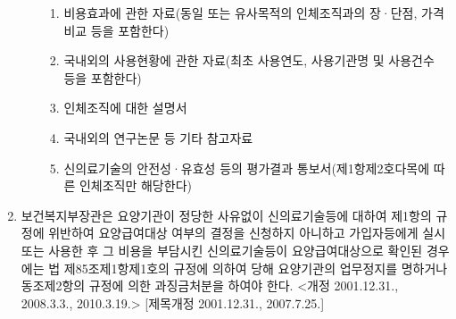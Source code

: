 \begin{enumerate}[①]
\begin{enumerate}[1.]
\begin{enumerate}[가.]
		\item 비용효과에 관한 자료(동일 또는 유사목적의 인체조직과의 장·단점, 가격 비교 등을 포함한다)
		\item 국내외의 사용현황에 관한 자료(최초 사용연도, 사용기관명 및 사용건수 등을 포함한다)
		\item 인체조직에 대한 설명서
		\item 국내외의 연구논문 등 기타 참고자료
		\item 신의료기술의 안전성·유효성 등의 평가결과 통보서(제1항제2호다목에 따른 인체조직만 해당한다)
		\end{enumerate}
	\end{enumerate}
\item 보건복지부장관은 요양기관이 정당한 사유없이 신의료기술등에 대하여 제1항의 규정에 위반하여 요양급여대상 여부의 결정을 신청하지 아니하고 가입자등에게 실시 또는 사용한 후 그 비용을 부담시킨 신의료기술등이 요양급여대상으로 확인된 경우에는 법 제85조제1항제1호의 규정에 의하여 당해 요양기관의 업무정지를 명하거나 동조제2항의 규정에 의한 과징금처분을 하여야 한다.  <개정 2001.12.31., 2008.3.3., 2010.3.19.>
[제목개정 2001.12.31., 2007.7.25.]
\end{enumerate}
